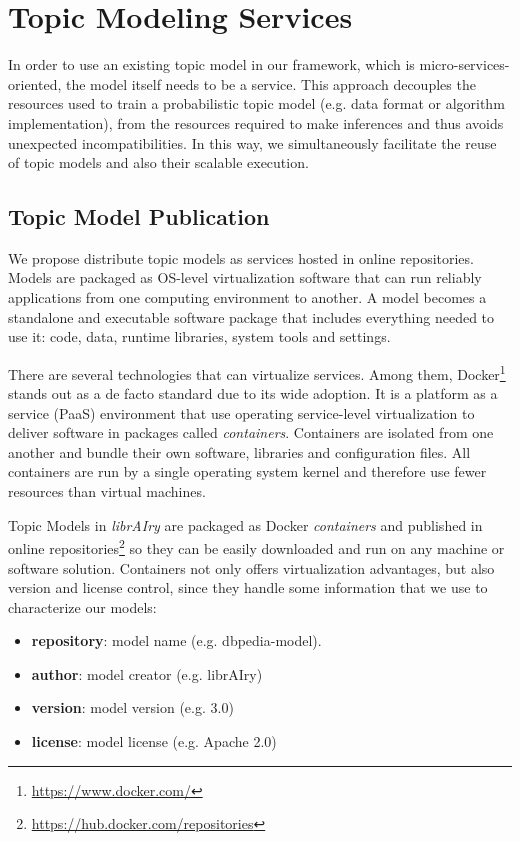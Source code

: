 \section{Topic Modeling Services}
\label{sec:reusable-topic-modeling}

In order to use an existing topic model in our framework, which is micro-services-oriented, the model itself needs to be a service. This approach decouples the resources used to train a probabilistic topic model (e.g. data format or algorithm implementation), from the resources required to  make inferences and thus avoids unexpected incompatibilities. In this way, we simultaneously facilitate the reuse of topic models and also their scalable execution.

\subsection{Topic Model Publication}
\label{sec:topic-model-publication}

We propose distribute topic models as services hosted in online repositories. Models are packaged as OS-level virtualization software that can run reliably applications from one computing environment to another. A model becomes a standalone and executable software package that includes everything needed to use it: code, data, runtime libraries, system tools and settings.

There are several technologies that can virtualize services. Among them, Docker\footnote{\url{https://www.docker.com/}} stands out as a de facto standard due to its wide adoption. It is a platform as a service (PaaS) environment that use operating service-level virtualization to deliver software in packages called \textit{containers}. Containers are isolated from one another and bundle their own software, libraries and configuration files. All containers are run by a single operating system kernel and therefore use fewer resources than virtual machines.

Topic Models in \textit{librAIry} are packaged as Docker \textit{containers} and published in online repositories\footnote{\url{https://hub.docker.com/repositories}} so they can be easily downloaded and run on any machine or software solution. Containers not only offers virtualization advantages, but also version and license control, since they handle some information that we use to characterize our models:
\begin{itemize}
\item \textbf{repository}: model name (e.g. dbpedia-model).
\item \textbf{author}: model creator (e.g. librAIry)
\item \textbf{version}: model version (e.g. 3.0)
\item \textbf{license}: model license (e.g. Apache 2.0)
\end{itemize}


